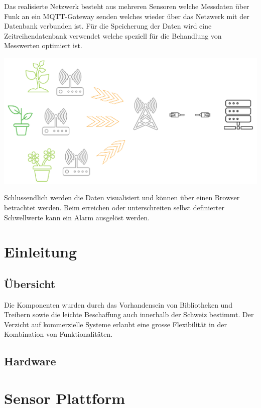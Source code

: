 \documentclass[
  12pt, %
  a4paper, %
  twoside, %
  openany, %
  numbers=noenddot, %
  BCOR=5mm, %
  parskip=half*, %
  thesis, %
]{bfhbook}
\begin{document}
Das realisierte Netzwerk besteht aus mehreren Sensoren welche Messdaten über Funk an ein MQTT-Gateway senden welches wieder über das Netzwerk mit der Datenbank verbunden ist. Für die Speicherung der Daten wird eine Zeitreihendatenbank verwendet welche speziell für die Behandlung von Messwerten optimiert ist.

  \begin{center}
    \includegraphics[width=14cm, left]{Bilder/Overview-2.png}
     \captionsetup{justification=centering}
  \end{center}
  Schlussendlich werden die Daten visualisiert und können über einen Browser betrachtet werden. Beim erreichen oder unterschreiten selbst definierter Schwellwerte kann ein Alarm ausgelöst werden.
\chapter{Einleitung}
\section{Übersicht}
Die Komponenten wurden durch das Vorhandensein von Bibliotheken und Treibern sowie die leichte Beschaffung auch innerhalb der Schweiz bestimmt. Der Verzicht auf kommerzielle Systeme erlaubt eine grosse Flexibilität in der Kombination von Funktionalitäten.
\section{Hardware}

\chapter{Sensor Plattform}
\end{document}
